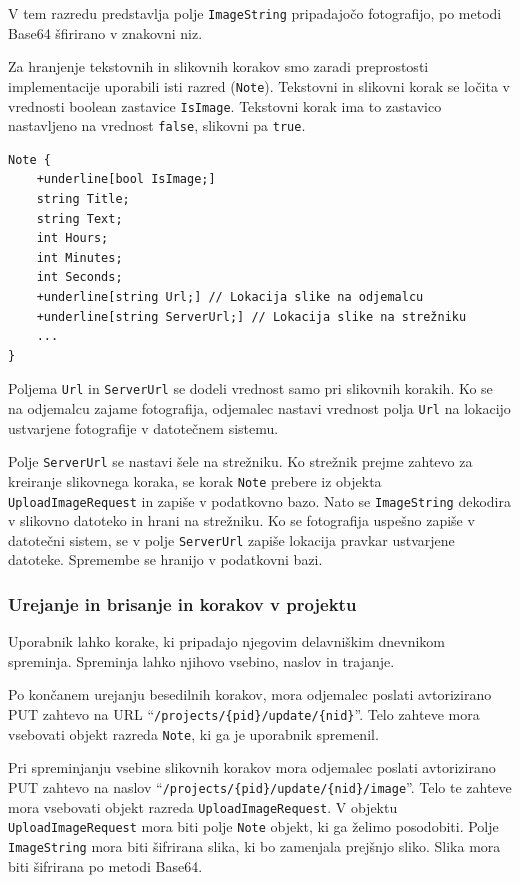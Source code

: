 \documentclass[a4paper, 12pt]{book}
\begin{document}
V tem razredu predstavlja polje \texttt{ImageString} pripadajočo fotografijo, po metodi Base64 šfirirano v znakovni niz.

Za hranjenje tekstovnih in slikovnih korakov smo zaradi preprostosti implementacije uporabili isti razred (\texttt{Note}).
Tekstovni in slikovni korak se ločita v vrednosti boolean zastavice \texttt{IsImage}.
Tekstovni korak ima to zastavico nastavljeno na vrednost \texttt{false}, slikovni pa \texttt{true}.

\begin{Verbatim}[commandchars=+\[\]]
Note { 
    +underline[bool IsImage;]
    string Title; 
    string Text; 
    int Hours; 
    int Minutes;
    int Seconds; 
    +underline[string Url;] // Lokacija slike na odjemalcu 
    +underline[string ServerUrl;] // Lokacija slike na strežniku
    ... 
}
\end{Verbatim}

Poljema \texttt{Url} in \texttt{ServerUrl} se dodeli vrednost samo pri slikovnih korakih.
Ko se na odjemalcu zajame fotografija, odjemalec nastavi vrednost polja \texttt{Url} na lokacijo ustvarjene fotografije v datotečnem sistemu.

Polje \texttt{ServerUrl} se nastavi šele na strežniku.
Ko strežnik prejme zahtevo za kreiranje slikovnega koraka, se korak \texttt{Note} prebere iz objekta \texttt{UploadImageRequest} in zapiše v podatkovno bazo.
Nato se \texttt{ImageString} dekodira v slikovno datoteko in hrani na strežniku.
Ko se fotografija uspešno zapiše v datotečni sistem, se v polje \texttt{ServerUrl} zapiše lokacija pravkar ustvarjene datoteke.
Spremembe se hranijo v podatkovni bazi.

\subsubsection{Urejanje in brisanje in korakov v projektu}

Uporabnik lahko korake, ki pripadajo njegovim delavniškim dnevnikom spreminja.
Spreminja lahko njihovo vsebino, naslov in trajanje.

Po končanem urejanju besedilnih korakov, mora odjemalec poslati avtorizirano PUT zahtevo na URL \enquote{\texttt{/projects/\{pid\}/update/\{nid\}}}.
Telo zahteve mora vsebovati objekt razreda \texttt{Note}, ki ga je uporabnik spremenil.

Pri spreminjanju vsebine slikovnih korakov mora odjemalec poslati avtorizirano PUT zahtevo na naslov \enquote{\texttt{/projects/\{pid\}/update/\{nid\}/image}}.
Telo te zahteve mora vsebovati objekt razreda \texttt{UploadImageRequest}.
V objektu \texttt{UploadImageRequest} mora biti polje \texttt{Note} objekt, ki ga želimo posodobiti.
Polje \texttt{ImageString} mora biti šifrirana slika, ki bo zamenjala prejšnjo sliko.
Slika mora biti šifrirana po metodi Base64.
\end{document}
